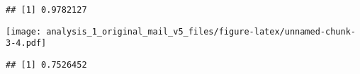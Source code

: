 \documentclass[
]{article}
\newenvironment{Shaded}{\begin{snugshade}}{\end{snugshade}}
\newcommand{\DataTypeTok}[1]{\textcolor[rgb]{0.13,0.29,0.53}{#1}}
\newcommand{\KeywordTok}[1]{\textcolor[rgb]{0.13,0.29,0.53}{\textbf{#1}}}
\newcommand{\NormalTok}[1]{#1}
\newcommand{\OperatorTok}[1]{\textcolor[rgb]{0.81,0.36,0.00}{\textbf{#1}}}
\newcommand{\StringTok}[1]{\textcolor[rgb]{0.31,0.60,0.02}{#1}}
\begin{document}
\begin{verbatim}
## [1] 0.9782127
\end{verbatim}

\begin{Shaded}
\end{Shaded}

\texttt{[image: analysis\_1\_original\_mail\_v5\_files/figure-latex/unnamed-chunk-3-4.pdf]}

\begin{Shaded}
\end{Shaded}

\begin{verbatim}
## [1] 0.7526452
\end{verbatim}
\end{document}
